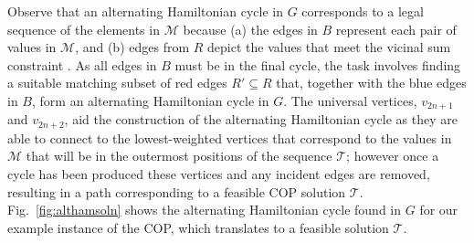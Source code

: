 \documentclass[a4paper,11pt,authoryear]{elsarticle}
\begin{document}
Observe that an alternating Hamiltonian cycle in $G$ corresponds to a legal sequence of the elements in $\mathcal{M}$ because (a) the edges in $B$ represent each pair of values in $\mathcal{M}$, and (b) edges from $R$ depict the values that meet the vicinal sum constraint \citep{hawa2020t}. As all edges in $B$ must be in the final cycle, the task involves finding a suitable matching subset of red edges $R' \subseteq R$ that, together with the blue edges in $B$, form an alternating Hamiltonian cycle in $G$. The universal vertices, $v_{2n+1}$ and $v_{2n+2}$, aid the construction of the alternating Hamiltonian cycle as they are able to connect to the lowest-weighted vertices that correspond to the values in $\mathcal{M}$ that will be in the outermost positions of the sequence $\mathcal{T}$; however once a cycle has been produced these vertices and any incident edges are removed, resulting in a path corresponding to a feasible COP solution $\mathcal{T}$. Fig.~\ref{fig:althamsoln} shows the alternating Hamiltonian cycle found in $G$ for our example instance of the COP, which translates to a feasible solution $\mathcal{T}$.


\end{document}
